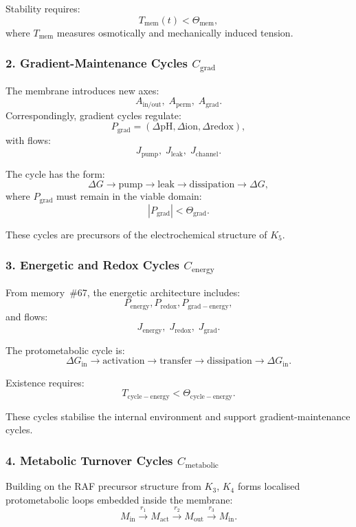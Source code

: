 Stability requires:
\[
  T_{\mathrm{mem}}(t) < \Theta_{\mathrm{mem}},
\]
where $T_{\mathrm{mem}}$ measures osmotically and mechanically
induced tension.

\subsubsection{2. Gradient-Maintenance Cycles $C_{\mathrm{grad}}$}

The membrane introduces new axes:
\[
  A_{\mathrm{in/out}},\;
  A_{\mathrm{perm}},\;
  A_{\mathrm{grad}}.
\]
Correspondingly, gradient cycles regulate:
\[
  P_{\mathrm{grad}}=
    (\Delta \mathrm{pH}, \Delta \mathrm{ion}, \Delta \mathrm{redox}),
\]
with flows:
\[
  J_{\mathrm{pump}},\;
  J_{\mathrm{leak}},\;
  J_{\mathrm{channel}}.
\]

The cycle has the form:
\[
  \Delta G \to \mathrm{pump} \to
  \mathrm{leak} \to \mathrm{dissipation} \to
  \Delta G,
\]
where $P_{\mathrm{grad}}$ must remain in the viable domain:
\[
  |P_{\mathrm{grad}}| < \Theta_{\mathrm{grad}}.
\]

These cycles are precursors of the electrochemical structure of $K_5$.

\subsubsection{3. Energetic and Redox Cycles $C_{\mathrm{energy}}$}

From memory~\#67, the energetic architecture includes:
\[
  P_{\mathrm{energy}},
  P_{\mathrm{redox}},
  P_{\mathrm{grad-energy}},
\]
and flows:
\[
  J_{\mathrm{energy}},\;
  J_{\mathrm{redox}},\;
  J_{\mathrm{grad}}.
\]

The protometabolic cycle is:
\[
  \Delta G_{\mathrm{in}} \to 
  \mathrm{activation} \to
  \mathrm{transfer} \to 
  \mathrm{dissipation} \to 
  \Delta G_{\mathrm{in}}.
\]

Existence requires:
\[
  T_{\mathrm{cycle-energy}} < \Theta_{\mathrm{cycle-energy}}.
\]

These cycles stabilise the internal environment and support
gradient-maintenance cycles.

\subsubsection{4. Metabolic Turnover Cycles $C_{\mathrm{metabolic}}$}

Building on the RAF precursor structure from $K_3$, $K_4$ forms
localised protometabolic loops embedded inside the membrane:
\[
  M_{\mathrm{in}} \xrightarrow{r_1}
  M_{\mathrm{act}} \xrightarrow{r_2}
  M_{\mathrm{out}} \xrightarrow{r_3}
  M_{\mathrm{in}}.
\]

